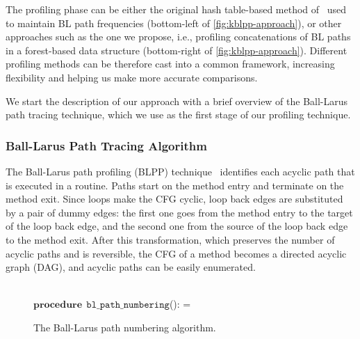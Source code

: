 The profiling phase can be either the original hash table-based method of~\cite{Ball96} used to maintain BL path frequencies
(bottom-left of \myfigure\ref{fig:kblpp-approach}), or other approaches such as the one we propose, i.e., profiling concatenations of BL paths in a forest-based data structure (bottom-right of \myfigure\ref{fig:kblpp-approach}). Different profiling methods can be therefore cast into a common framework, increasing flexibility and helping us make more accurate comparisons. %

We start the description of our approach with a brief overview of the Ball-Larus path tracing technique, which we use as the first stage of our profiling technique.

\subsubsection*{Ball-Larus Path Tracing Algorithm}

The Ball-Larus path profiling (BLPP) technique~\cite{Ball96} identifies each acyclic path that is executed in a routine. Paths start on the method entry and terminate on the method exit. Since loops make the CFG cyclic, loop back edges are substituted by a pair of dummy edges: the first one goes from the method entry to the target of the loop back edge, and the second one from the source of the loop back edge to the method exit. After this transformation, which preserves the number of acyclic paths and is reversible, the CFG of a method becomes a directed acyclic graph (DAG), and acyclic paths can be easily enumerated.

\ifdefined\noauthorea
\begin{figure}[h!]
\IncMargin{2em}
\begin{algorithm}[H]
\DontPrintSemicolon
\LinesNumbered
\SetAlgoNoLine
\SetNlSkip{1em}
\Indm\Indmm
\hrulefill\\
$\mathbf{procedure} \> \> \texttt{bl\_path\_numbering}$():\;
\vspace{1mm}
\everypar={\nl}
\Indp\Indpp
{}
\vspace{-2mm}
\Indm\Indmm
\nonl\hrulefill\vspace{1mm}\\
\DecMargin{5em}
\caption{\label{alg:kblpp-bl-numbering} The Ball-Larus path numbering algorithm.}
\IncMargin{3em}
\end{algorithm}
\end{figure}

